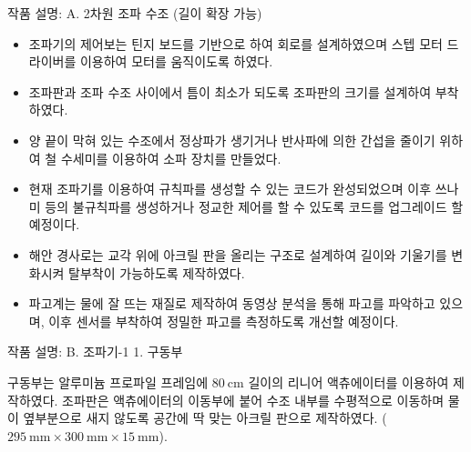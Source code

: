 \documentclass[Junlampaper, portrait]{Junlam_PosterK}
\begin{document}
\begin{poster}
\begin{posterbox}[name=wtank,span=2,column=1,row=0] {작품 설명: A. 2차원 조파 수조 (길이 확장 가능)}
\begin{itemize}
    \item 조파기의 제어보는 틴지 보드를 기반으로 하여 회로를 설계하였으며 스텝 모터 드라이버를 이용하여 모터를 움직이도록 하였다. 
    \item 조파판과 조파 수조 사이에서 틈이 최소가 되도록 조파판의 크기를 설계하여 부착하였다. 
    \item 양 끝이 막혀 있는 수조에서 정상파가 생기거나 반사파에 의한 간섭을 줄이기 위하여 철 수세미를 이용하여 소파 장치를 만들었다. 
    \item 현재 조파기를 이용하여 규칙파를 생성할 수 있는 코드가 완성되었으며 이후 쓰나미 등의 불규칙파를 생성하거나 정교한 제어를 할 수 있도록 코드를 업그레이드 할 예정이다. 
    \item 해안 경사로는 교각 위에 아크릴 판을 올리는 구조로 설계하여 길이와 기울기를 변화시켜 탈부착이 가능하도록 제작하였다. 
    \item 파고계는 물에 잘 뜨는 재질로 제작하여 동영상 분석을 통해 파고를 파악하고 있으며, 이후 센서를 부착하여 정밀한 파고를 측정하도록 개선할 예정이다.
\end{itemize}

        
\end{posterbox}

\begin{posterbox}[name=circuit, column=0, below=theo]{작품 설명: B. 조파기-1} %
\small {1. 구동부\\}
    \scriptsize {
    
    구동부는 알루미늄 프로파일 프레임에 $80\mathrm{~cm}$ 길이의 리니어 액츄에이터를 이용하여 제작하였다. 조파판은 액츄에이터의 이동부에 붙어 수조 내부를 수평적으로 이동하며 물이 옆부분으로 새지 않도록 공간에 딱 맞는 아크릴 판으로 제작하였다. ($295\mathrm{~mm}\times 300\mathrm{~mm} \times 15\mathrm{~mm}$).\\}
    

\end{posterbox}
\end{poster}
\end{document}
